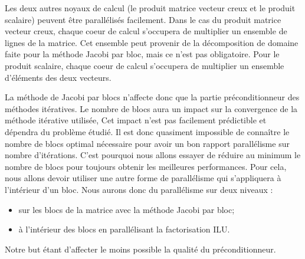Les deux autres noyaux de calcul (le produit matrice vecteur creux et le produit scalaire) peuvent être parallélisés facilement.
%
Dans le cas du produit matrice vecteur creux, chaque coeur de calcul s'occupera de multiplier un ensemble de lignes de la matrice.
%
Cet ensemble peut provenir de la décomposition de domaine faite pour la méthode Jacobi par bloc, mais ce n'est pas obligatoire.
%
Pour le produit scalaire, chaque coeur de calcul s'occupera de multiplier un ensemble d'éléments des deux vecteurs.

La méthode de Jacobi par blocs n'affecte donc que la partie préconditionneur des méthodes itératives.
%
Le nombre de blocs aura un impact sur la convergence de la méthode itérative utilisée,
%
Cet impact n'est pas facilement prédictible et dépendra du problème étudié.
%
Il est donc quasiment impossible de connaître le nombre de blocs optimal nécessaire pour avoir un bon rapport parallélisme sur nombre d'itérations.
%
C'est pourquoi nous allons essayer de réduire au minimum le nombre de blocs pour toujours obtenir les meilleures performances.
%
Pour cela, nous allons devoir utiliser une autre forme de parallélisme qui s'appliquera à l'intérieur d'un bloc.
%
Nous aurons donc du parallélisme sur deux niveaux :
\begin{itemize}
  \item sur les blocs de la matrice avec la méthode Jacobi par bloc;
  \item à l'intérieur des blocs en parallélisant la factorisation ILU.
\end{itemize}
%
Notre but étant d'affecter le moins possible la qualité du préconditionneur.
